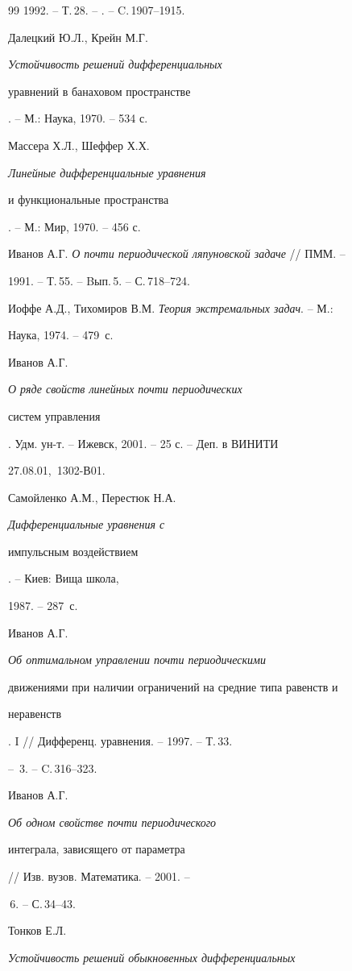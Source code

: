 \begin{thebibliography}{99}
1992. -- Т.\,28. -- . -- C.\,1907--1915.




Далецкий Ю.Л., Крейн М.Г. {\em Устойчивость решений дифференциальных


уравнений в банаховом пространстве}. -- М.: Наука, 1970. -- 534 с.




Массера Х.Л., Шеффер Х.Х. {\em Линейные дифференциальные уравнения


и функциональные пространства}. -- М.: Мир, 1970. -- 456 с.




Иванов А.Г. {\em О почти периодической ляпуновской задаче} // ПММ. --


1991. -- Т.\,55. -- Bып.\,5. -- С.\,718--724.




Иоффе А.Д., Тихомиров В.М. {\em Теория экстремальных задач}. -- М.:


Наука, 1974. -- 479~с.




Иванов А.Г. {\em О ряде свойств линейных почти периодических


систем управления}. Удм. ун-т. -- Ижевск, 2001. -- 25 с. -- Деп. в ВИНИТИ


27.08.01, \No\,1302-В01.




Самойленко А.М., Перестюк Н.А. {\em Дифференциальные уравнения с


импульсным воздействием}. -- Киев: Вища школа,


1987. -- 287~с.




Иванов А.Г. {\em Об оптимальном управлении почти периодическими


движениями при наличии ограничений на средние типа равенств и


неравенств}. I // Дифференц. уравнения. -- 1997. -- Т.\,33.


-- \No\,3. -- C.\,316--323.




Иванов А.Г. {\em Об одном свойстве почти периодического


интеграла, зависящего от параметра} // Изв. вузов. Математика. -- 2001. --


\No\,6. -- С.\,34--43.




Тонков Е.Л. {\em Устойчивость решений обыкновенных дифференциальных


}
\end{thebibliography}
